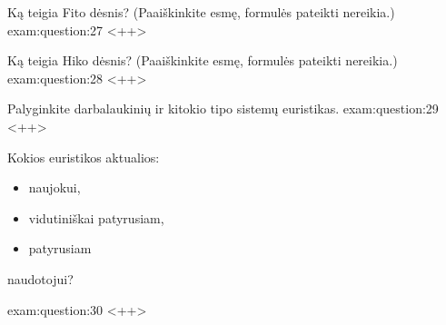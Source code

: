 \begin{question}{%
  Ką teigia Fito dėsnis? (Paaiškinkite esmę, formulės pateikti nereikia.)
  }{exam:question:27}
  <++>
\end{question}

\begin{question}{%
  Ką teigia Hiko dėsnis? (Paaiškinkite esmę, formulės pateikti nereikia.)
  }{exam:question:28}
  <++>
\end{question}

\begin{question}{%
  Palyginkite darbalaukinių ir kitokio tipo sistemų euristikas.
  }{exam:question:29}
  <++>
\end{question}

\begin{question}{%
  Kokios euristikos aktualios:
  \begin{itemize}
    \item naujokui,
    \item vidutiniškai patyrusiam,
    \item patyrusiam
  \end{itemize}
  naudotojui?
  }{exam:question:30}
  <++>
\end{question}
